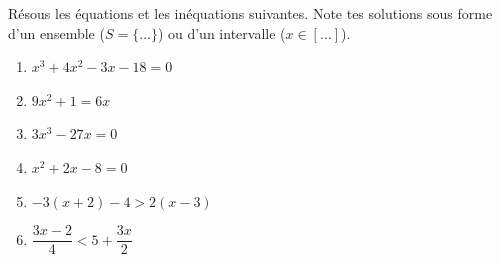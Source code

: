 \documentclass[../partie1.tex]{subfiles}
\begin{document}
\begin{exercise}[points=10]
    Résous les équations et les inéquations suivantes. Note tes solutions sous forme d'un ensemble (\(S = \{\dots\}\)) ou d'un intervalle (\(x \in [\dots]\)).
    \begin{enumerate}[cols=2]
        \item %
              $x^{3}+4x^{2}-3x -18=0$
        \item %
              $9x^{2}+1=6x$
        \item %
              $3x^{3}-27x=0$
        \item %
              $x^{2}+2x-8 =0$
        \item \(-3(x + 2)-4 > 2(x-3)\)
        \item \(\dfrac{3x-2}{4}<5 + \dfrac{3x}{2}\)
    \end{enumerate}
\end{exercise}
\end{document}
